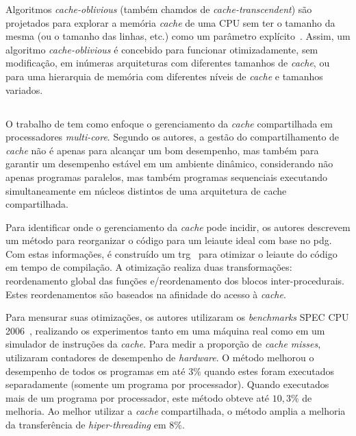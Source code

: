 Algoritmos \textit{cache-oblivious} (também chamdos de \textit{cache-tran\-scen\-dent}) são projetados para explorar a memória \textit{cache} de uma CPU sem ter o tamanho da mesma (ou o tamanho das linhas, etc.) como um parâmetro explícito~\cite{frigo1999cache}. Assim, um algoritmo \textit{cache-oblivious} é concebido para funcionar otimizadamente, sem modificação, em inúmeras arquiteturas com diferentes tamanhos de \textit{cache}, ou para uma hierarquia de memória com diferentes níveis de \textit{cache} e tamanhos variados.

\subsection{}

O trabalho de  tem como enfoque o gerenciamento da \textit{cache} compartilhada em processadores \textit{multi-core}.
Segundo os autores, a gestão do compartilhamento de \textit{cache} não é apenas para alcançar um bom desempenho, mas também para garantir um desempenho estável em um ambiente dinâmico, considerando não apenas programas paralelos, mas também programas sequenciais executando simultaneamente em núcleos distintos de uma arquitetura de cache compartilhada.

Para identificar onde o gerenciamento da \textit{cache} pode incidir, os autores descrevem um método para reorganizar o código para um leiaute ideal com base no \ac{pdg}.
Com estas informações, é construído um \ac{trg}~\cite{gloy1999procedure} para otimizar o leiaute do código em tempo de compilação.
A otimização realiza duas transformações: reordenamento global das funções e\@/\@ou reordenamento dos blocos inter-procedurais. Estes reordenamentos são baseados na afinidade do acesso à \textit{cache}.

Para mensurar suas otimizações, os autores utilizaram os \textit{benchmarks} SPEC CPU 2006~\cite{spec2006}, realizando os experimentos tanto em uma máquina real como em um simulador de instruções da \textit{cache}. Para medir a proporção de \textit{cache misses}, utilizaram contadores de desempenho de \textit{hardware}.
O método melhorou o desempenho de todos os programas em até $3\%$ quando estes foram executados separadamente (somente um programa por processador).
Quando executados mais de um programa por processador, este método obteve até $10,3\%$ de melhoria. Ao melhor utilizar a \textit{cache} compartilhada, o método amplia a melhoria da transferência de \textit{hiper-threading} em $8\%$.

